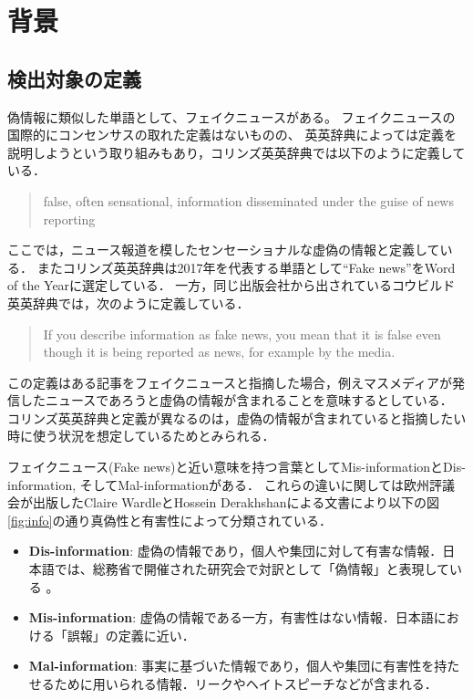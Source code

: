 \chapter{背景}
\label{ch:background}
\section{検出対象の定義}
偽情報に類似した単語として、フェイクニュースがある。
フェイクニュースの国際的にコンセンサスの取れた定義はないものの、
英英辞典によっては定義を説明しようという取り組みもあり，コリンズ英英辞典では以下のように定義している\cite{collins_fake}．
\begin{quote}
    false, often sensational, information disseminated under the guise of news reporting
\end{quote}
ここでは，ニュース報道を模したセンセーショナルな虚偽の情報と定義している．
またコリンズ英英辞典は2017年を代表する単語として``Fake news''をWord of the Yearに選定している\cite{collins_word}．
一方，同じ出版会社から出されているコウビルド英英辞典では，次のように定義している\cite{collins_fake}．
\begin{quote}
    If you describe information as fake news, you mean that it is false even though it is being reported as news, for example by the media.
\end{quote}
この定義はある記事をフェイクニュースと指摘した場合，例えマスメディアが発信したニュースであろうと虚偽の情報が含まれることを意味するとしている．
コリンズ英英辞典と定義が異なるのは，虚偽の情報が含まれていると指摘したい時に使う状況を想定しているためとみられる．


フェイクニュース(Fake news)と近い意味を持つ言葉としてMis-informationとDis-information, そしてMal-informationがある．
これらの違いに関しては欧州評議会が出版したClaire WardleとHossein Derakhshanによる文書により以下の図\ref{fig:info}の通り真偽性と有害性によって分類されている\cite{wardle2017information}．

\begin{itemize}
    \item \textbf{Dis-information}: 虚偽の情報であり，個人や集団に対して有害な情報．日本語では、総務省で開催された研究会で対訳として「偽情報」と表現している \cite{soumuDisinfo}。
    \item \textbf{Mis-information}: 虚偽の情報である一方，有害性はない情報．日本語における「誤報」の定義に近い．
    \item \textbf{Mal-information}: 事実に基づいた情報であり，個人や集団に有害性を持たせるために用いられる情報．リークやヘイトスピーチなどが含まれる．
\end{itemize}

